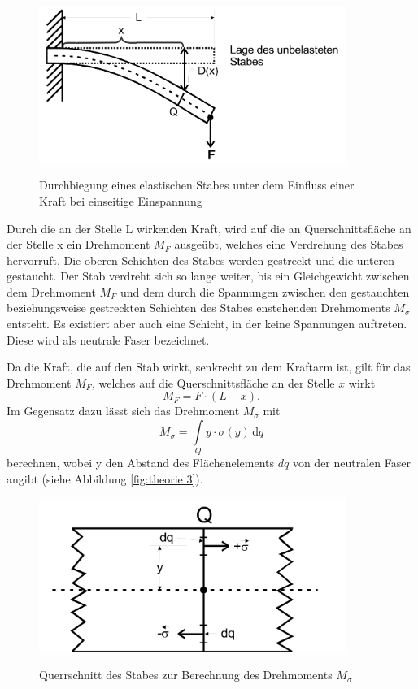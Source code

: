 \begin{figure}[h]
    \centering
    \includegraphics[width=10cm]{Theorie2.png}
    \label{fig:theorie2}
    \caption{Durchbiegung eines elastischen Stabes unter dem Einfluss einer Kraft bei einseitige Einspannung}
\end{figure}
\noindent
Durch die an der Stelle L wirkenden Kraft, wird auf
die an Querschnittsfläche an der Stelle x ein 
Drehmoment $M_F$ ausgeübt, welches eine Verdrehung 
des Stabes hervorruft. Die oberen Schichten des 
Stabes werden gestreckt und die unteren gestaucht. 
Der Stab verdreht sich so lange weiter, bis ein 
Gleichgewicht zwischen dem Drehmoment $M_F$
und dem durch die Spannungen zwischen den gestauchten
beziehungsweise gestreckten Schichten des Stabes 
enstehenden Drehmoments $M_{\sigma}$ entsteht.
Es existiert aber auch eine Schicht, in der keine 
Spannungen auftreten. Diese wird als neutrale
Faser bezeichnet.

Da die Kraft, die auf den Stab wirkt, senkrecht 
zu dem Kraftarm ist, gilt für das Drehmoment 
$M_F$, welches auf die Querschnittsfläche an der
Stelle $x$ wirkt
\begin{equation}
    M_F = F \cdot (L-x).
    \label{eq:2}
\end{equation}
\noindent
Im Gegensatz dazu lässt sich das Drehmoment 
$M_{\sigma}$ mit 
\begin{equation}
    M_{\sigma} = \int\limits_Q \! y \cdot \sigma (y) \, \mathrm{d}q
    \label{eq:3}
\end{equation}
\noindent berechnen, wobei y den Abstand des 
Flächenelements $dq$ von der neutralen Faser
angibt (siehe Abbildung \ref{fig:theorie 3}). 


\begin{figure}[h]
    \centering
    \includegraphics[width=10cm]{Theorie3.png}
    \label{fig:theorie1}
    \caption{Querrschnitt des Stabes zur Berechnung des Drehmoments $M_{\sigma}$}
\end{figure}
\noindent

